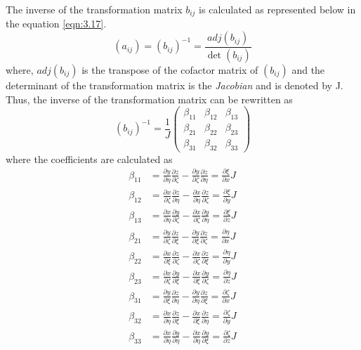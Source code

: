The inverse of the transformation matrix $b_{ij}$ is calculated as represented below in the equation \ref{eqn:3.17}.
\begin{equation}
\left(a_{ij}\right) = \left(b_{ij}\right)^{-1} = \frac{adj\left(b_{ij}\right)}{\det\left(b_{ij}\right)} 
\label{eqn:3.17}
\end{equation}	
where, $adj\left(b_{ij}\right)$ is the transpose of the cofactor matrix of $\left(b_{ij}\right)$ and the determinant of the transformation matrix is the \textit{Jacobian} and is denoted by J. Thus, the inverse of the transformation matrix can be rewritten as 
\begin{equation}
\left(b_{ij}\right)^{-1} = \frac{1}{J}
\begin{pmatrix}
\beta_{11} & \beta_{12} & \beta_{13}\\
\beta_{21} & \beta_{22} & \beta_{23}\\
\beta_{31} & \beta_{32} & \beta_{33}
\end{pmatrix}
\label{eqn:3.18}
\end{equation}
where the coefficients are calculated as 
\begin{align}
\beta_{11} &= \frac{\partial{y}}{\partial{\eta}}\frac{\partial{z}}{\partial{\zeta}} - \frac{\partial{y}}{\partial{\zeta}}\frac{\partial{z}}{\partial{\eta}} = \frac{\partial{\xi}}{\partial{x}}J\\
	\beta_{12} &= \frac{\partial{x}}{\partial{\zeta}}\frac{\partial{z}}{\partial{\eta}} - \frac{\partial{x}}{\partial{\eta}}\frac{\partial{z}}{\partial{\zeta}} = \frac{\partial{\xi}}{\partial{y}}J\\
	\beta_{13} &= \frac{\partial{x}}{\partial{\eta}}\frac{\partial{y}}{\partial{\zeta}} - \frac{\partial{x}}{\partial{\zeta}}\frac{\partial{y}}{\partial{\eta}} = \frac{\partial{\xi}}{\partial{z}}J\\
	\beta_{21} &= \frac{\partial{y}}{\partial{\zeta}}\frac{\partial{z}}{\partial{\xi}} - \frac{\partial{y}}{\partial{\xi}}\frac{\partial{z}}{\partial{\zeta}} = \frac{\partial{\eta}}{\partial{x}}J\\
	\beta_{22} &= \frac{\partial{x}}{\partial{\xi}}\frac{\partial{z}}{\partial{\zeta}} - \frac{\partial{x}}{\partial{\zeta}}\frac{\partial{z}}{\partial{\xi}} = \frac{\partial{\eta}}{\partial{y}}J\\
	\beta_{23} &= \frac{\partial{x}}{\partial{\zeta}}\frac{\partial{y}}{\partial{\xi}} - \frac{\partial{x}}{\partial{\xi}}\frac{\partial{y}}{\partial{\zeta}} = \frac{\partial{\eta}}{\partial{z}}J\\
	\beta_{31} &= \frac{\partial{y}}{\partial{\xi}}\frac{\partial{z}}{\partial{\eta}} - \frac{\partial{y}}{\partial{\eta}}\frac{\partial{z}}{\partial{\xi}} = \frac{\partial{\zeta}}{\partial{x}}J\\
	\beta_{32} &= \frac{\partial{x}}{\partial{\eta}}\frac{\partial{z}}{\partial{\xi}} - \frac{\partial{x}}{\partial{\xi}}\frac{\partial{z}}{\partial{\eta}} = \frac{\partial{\zeta}}{\partial{y}}J\\
	\beta_{33} &= \frac{\partial{x}}{\partial{\eta}}\frac{\partial{y}}{\partial{\eta}} - \frac{\partial{x}}{\partial{\eta}}\frac{\partial{y}}{\partial{\xi}} = \frac{\partial{\zeta}}{\partial{z}}J
 \label{eqn:3.19}
\end{align}

